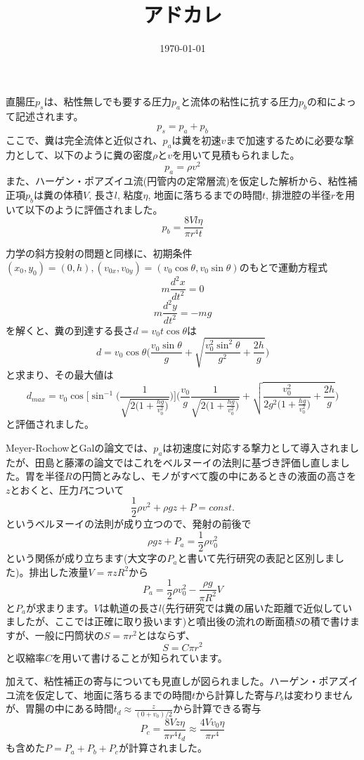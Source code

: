 \documentclass[dvipdfmx]{jlreq}
\title{アドカレ}
\date{\today}
\begin{document}
\maketitle

直腸圧$p_s$は、粘性無しでも要する圧力$p_a$と流体の粘性に抗する圧力$p_b$の和によって記述されます。
\[
p_s = p_a + p_b
\]
ここで、糞は完全流体と近似され、$p_a$は糞を初速$v$まで加速するために必要な撃力として、以下のように糞の密度$\rho$と$v$を用いて見積もられました。
\[
p_a= \rho v^2
\]
また、ハーゲン・ポアズイユ流(円管内の定常層流)を仮定した解析から、粘性補正項$p_b$は糞の体積$V$, 長さ$l$, 粘度$\eta$, 地面に落ちるまでの時間$t$, 排泄腔の半径$r$を用いて以下のように評価されました。
\[
p_b= \frac{8Vl\eta}{\pi r^4 t}
\]

力学の斜方投射の問題と同様に、初期条件$(x_0,y_0)=(0,h), (v_{0x},v_{0y})=(v_0 \cos\theta, v_0 \sin\theta)$のもとで運動方程式
\[
m \frac{d^2x}{dt^2} = 0
\]
\[
m \frac{d^2y}{dt^2} = -mg
\]
を解くと、糞の到達する長さ$d=v_0 t \cos\theta$は
\[
d=v_0 \cos\theta \bigg(
\frac{v_0\sin \theta}{g}
+ \sqrt{\frac{v^2_0\sin^2 \theta}{g^2}+\frac{2h}{g}}
\bigg)
\]
と求まり、その最大値は
\[
d_{max}=v_0 \cos \Bigg[\sin^{-1}\bigg( 
\frac{1}{\sqrt{2\Big(1+\frac{hg}{v^2_0} \Big)}}
\bigg) \Bigg]
\Bigg(
\frac{v_0}{g} \frac{1}{\sqrt{2\Big(1+\frac{hg}{v^2_0}\Big)}}
+ \sqrt{\frac{v^2_0}{2g^2\Big(1+\frac{hg}{v^2_0}\Big)}+\frac{2h}{g}}
\Bigg)
\]
と評価されました。

Meyer-RochowとGalの論文では、$p_a$は初速度に対応する撃力として導入されましたが、田島と藤澤の論文ではこれをベルヌーイの法則に基づき評価し直しました。胃を半径$R$の円筒とみなし、モノがすべて腹の中にあるときの液面の高さを$z$とおくと、圧力$P$について
\[
\frac{1}{2}\rho v^2 + \rho gz + P = const.
\]
というベルヌーイの法則が成り立つので、発射の前後で
\[
\rho gz + P_a =\frac{1}{2}\rho v^2_0
\]
という関係が成り立ちます(大文字の$P_a$と書いて先行研究の表記と区別しました)。排出した液量$V=\pi z R^2$から
\[
P_a = \frac{1}{2}\rho v^2_0 - \frac{\rho g}{\pi R^2} V
\]
と$P_a$が求まります。$V$は軌道の長さ$l$(先行研究では糞の届いた距離で近似していましたが、ここでは正確に取り扱います)と噴出後の流れの断面積$S$の積で書けますが、一般に円筒状の$S=\pi r^2$とはならず、
\[
S= C \pi r^2
\]
と収縮率$C$を用いて書けることが知られています。

加えて、粘性補正の寄与についても見直しが図られました。ハーゲン・ポアズイユ流を仮定して、地面に落ちるまでの時間$t$から計算した寄与$P_b$は変わりませんが、胃腸の中にある時間$t_d \approx \frac{z}{(0+v_0)/2}$から計算できる寄与
\[
P_c =\frac{8Vz\eta}{\pi r^4 t_d} \approx \frac{4Vv_0\eta}{\pi r^4}
\]
も含めた$P=P_a+P_b+P_c$が計算されました。
\end{document}
